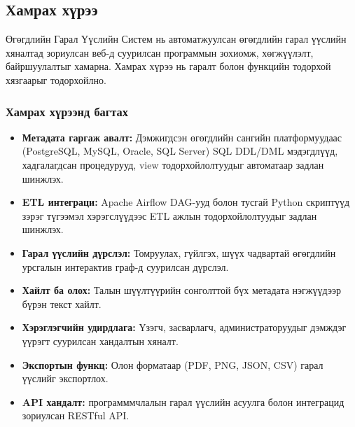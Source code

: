 \subsection{Хамрах хүрээ}
\label{subsec:dl_scope}

Өгөгдлийн Гарал Үүслийн Систем нь автоматжуулсан өгөгдлийн гарал үүслийн хяналтад зориулсан веб-д суурилсан программын зохиомж, хөгжүүлэлт, байршуулалтыг хамарна. Хамрах хүрээ нь гаралт болон функцийн тодорхой хязгаарыг тодорхойлно.

\subsubsection{Хамрах хүрээнд багтах}

\begin{itemize}
    \item \textbf{Метадата гаргаж авалт:} Дэмжигдсэн өгөгдлийн сангийн платформуудаас (PostgreSQL, MySQL, Oracle, SQL Server) SQL DDL/DML мэдэгдлүүд, хадгалагдсан процедурууд, view тодорхойлолтуудыг автоматаар задлан шинжлэх.
    
    \item \textbf{ETL интеграци:} Apache Airflow DAG-ууд болон тусгай Python скриптүүд зэрэг түгээмэл хэрэгслүүдээс ETL ажлын тодорхойлолтуудыг задлан шинжлэх.
    
    \item \textbf{Гарал үүслийн дүрслэл:} Томруулах, гүйлгэх, шүүх чадвартай өгөгдлийн урсгалын интерактив граф-д суурилсан дүрслэл.
    
    \item \textbf{Хайлт ба олох:} Талын шүүлтүүрийн сонголттой бүх метадата нэгжүүдээр бүрэн текст хайлт.
    
    \item \textbf{Хэрэглэгчийн удирдлага:} Үзэгч, засварлагч, администраторуудыг дэмждэг үүрэгт суурилсан хандалтын хяналт.
    
    \item \textbf{Экспортын функц:} Олон форматаар (PDF, PNG, JSON, CSV) гарал үүслийг экспортлох.
    
    \item \textbf{API хандалт:} программмчлалын гарал үүслийн асуулга болон интеграцид зориулсан RESTful API.
\end{itemize}

